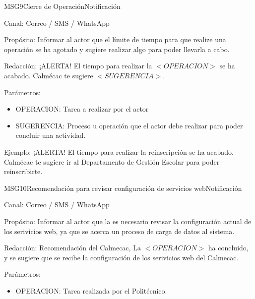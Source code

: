 \begin{mensaje}{MSG9}{Cierre de Operación}{Notificación \msgNotif}
	\item[Canal:] Correo / SMS / WhatsApp
	\item[Propósito:] Informar al actor que el límite de tiempo para que realize una operación se ha agotado y sugiere realizar algo para poder llevarla a cabo.
	\item[Redacción:]¡ALERTA! El tiempo para realizar la $<OPERACION>$ se ha acabado. Calmécac te sugiere $<SUGERENCIA>$.
	\item[Parámetros:]\cdtEmpty
	\begin{itemize}
		\item OPERACION: Tarea a realizar por el actor
		\item SUGERENCIA: Proceso u operación que el actor debe realizar para poder concluir una actividad.
	\end{itemize}
	\item[Ejemplo:] ¡ALERTA! El tiempo para realizar la reinscripción se ha acabado. Calmécac te sugiere ir al Departamento de Gestión Escolar para poder reinscribirte.
\end{mensaje}





\begin{mensaje}{MSG10}{Recomendación para revisar configuración de servicios web}{Notificación \msgNotif}
	\item[Canal:] Correo / SMS / WhatsApp
	\item[Propósito:] Informar al actor que la es necesario revisar la configuración actual de los serivicios web, ya que se acerca un proceso de carga de datos al sistema.
	\item[Redacción:] Recomendación del Calmecac, La $<OPERACION>$ ha concluido, y se sugiere que se recibe la configuración de los serivicios web del Calmecac.
	\item[Parámetros:] \cdtEmpty
	\begin{itemize}
		\item OPERACION: Tarea realizada por el Politécnico.
	\end{itemize}
\end{mensaje}
